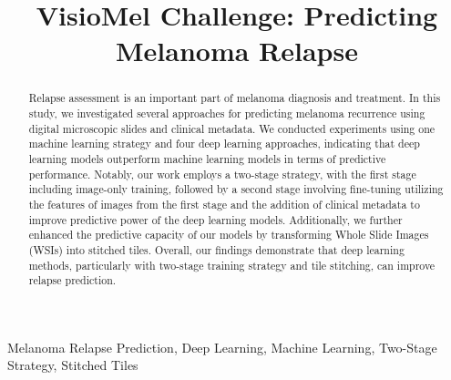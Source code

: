 \documentclass[conference]{IEEEtran}
\begin{document}
\title{VisioMel Challenge: Predicting Melanoma Relapse\\
}

\author{
}
\maketitle
\begin{abstract}
Relapse assessment is an important part of melanoma diagnosis and treatment. 
In this study, we investigated several approaches for predicting melanoma recurrence using digital microscopic slides and clinical metadata. We conducted experiments using one machine learning strategy and four deep learning approaches, indicating that deep learning models outperform machine learning models in terms of predictive performance. Notably, our work employs a two-stage strategy, with the first stage including image-only training, followed by a second stage involving fine-tuning utilizing the features of images from the first stage and the addition of clinical metadata to improve predictive power of the deep learning models. Additionally, we further enhanced the predictive capacity of our models by transforming Whole Slide Images (WSIs) into stitched tiles. Overall, our findings demonstrate that deep learning methods, particularly with two-stage training strategy and tile stitching, can improve relapse prediction.
\end{abstract}

\begin{IEEEkeywords}
Melanoma Relapse Prediction, Deep Learning, Machine Learning, Two-Stage Strategy, Stitched Tiles
\end{IEEEkeywords}
\end{document}
